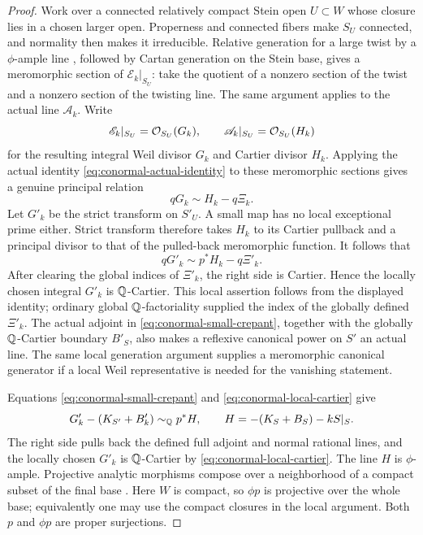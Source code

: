 \begin{proof}
Work over a connected relatively compact Stein open \(U\subset W\) whose closure
lies in a chosen larger open.  Properness and connected fibers make
\(S_U\) connected, and normality then makes it irreducible.  Relative
generation for a large twist
by a \(\phi\)-ample line \cite[Theorem~2.12]{DasHaconPaun2024},
followed by Cartan generation on the Stein
base, gives a meromorphic section of \(\mathscr E_k|_{S_U}\): take the
quotient of a nonzero section of the twist and a nonzero section of the
twisting line.  The same argument applies to the actual line
\(\mathscr A_k\).  Write
\[
 \mathscr E_k|_{S_U}=\mathcal O_{S_U}(G_k),\qquad
 \mathscr A_k|_{S_U}=\mathcal O_{S_U}(H_k)
\]
for the resulting integral Weil divisor \(G_k\) and Cartier divisor
\(H_k\).  Applying the actual identity
\eqref{eq:conormal-actual-identity} to these meromorphic sections gives
a genuine principal relation
\[
 qG_k\sim H_k-q\Xi_k .
\]
Let \(G'_k\) be the strict transform on \(S'_U\).  A small map has no
local exceptional prime either.  Strict transform therefore takes
\(H_k\) to its Cartier pullback and a principal divisor to that of the
pulled-back meromorphic function.  It follows that
\begin{equation}\label{eq:conormal-local-cartier}
 qG'_k\sim p^*H_k-q\Xi'_k .
\end{equation}
After clearing the global indices of \(\Xi'_k\), the right side is
Cartier.  Hence the locally chosen integral \(G'_k\) is
\(\mathbb Q\)-Cartier.  This local assertion follows from the displayed
identity; ordinary global \(\mathbb Q\)-factoriality supplied the index of the
globally defined \(\Xi'_k\).
The actual adjoint in \eqref{eq:conormal-small-crepant}, together with
the globally \(\mathbb Q\)-Cartier boundary \(B'_S\), also makes a reflexive
canonical power on \(S'\) an actual line.  The same local generation
argument supplies a meromorphic canonical generator if a local Weil
representative is needed for the vanishing statement.

Equations \eqref{eq:conormal-small-crepant} and
\eqref{eq:conormal-local-cartier} give
\begin{equation}\label{eq:conormal-kv-difference}
 G'_k-(K_{S'}+B'_k)\sim_\mathbb Q p^*H,\qquad
 H=-(K_S+B_S)-kS|_S .
\end{equation}
The right side pulls back the defined full adjoint and normal rational
lines, and the locally chosen \(G'_k\) is \(\mathbb Q\)-Cartier by
\eqref{eq:conormal-local-cartier}.  The line \(H\) is \(\phi\)-ample.
Projective analytic
morphisms compose over a neighborhood of a compact subset of the final
base \cite[Remark~2.11]{DasHaconPaun2024}.  Here \(W\) is compact, so
\(\phi p\) is projective over the whole base; equivalently one may use
the compact closures in the local argument.  Both \(p\) and \(\phi p\)
are proper surjections.


\end{proof}
